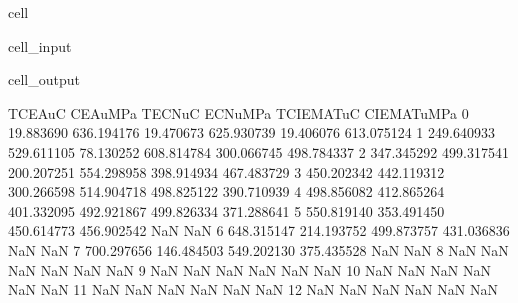 \documentclass[letterpaper,10pt,english]{jupyterBook}
\begin{document}
\begin{sphinxuseclass}{cell}
\begin{sphinxVerbatimInput}
\begin{sphinxuseclass}{cell_input}
\begin{sphinxVerbatim}[commandchars=\\\{\}]
					  \PYG{p}{[}\PYG{p}{[}\PYG{p}{]}    \PYG{p}{]}  
					
					 
					 \PYG{p}{[}\PYG{p}{]} \PYG{o}{*} \PYG{n}{i}    \PYG{p}{(}\PYG{p}{)}
				\end{sphinxVerbatim}
				
		\end{sphinxuseclass}\end{sphinxVerbatimInput}
		\begin{sphinxVerbatimOutput}
			
			\begin{sphinxuseclass}{cell_output}
				\begin{sphinxVerbatim}[commandchars=\\\{\}]
					T\PYGZus{}CEA\PYGZus{}uC    CEA\PYGZus{}uMPa    T\PYGZus{}ECN\PYGZus{}uC    ECN\PYGZus{}uMPa  T\PYGZus{}CIEMAT\PYGZus{}uC  CIEMAT\PYGZus{}uMPa  \PYGZbs{}
					0    19.883690  636.194176   19.470673  625.930739    19.406076   613.075124   
					1   249.640933  529.611105   78.130252  608.814784   300.066745   498.784337   
					2   347.345292  499.317541  200.207251  554.298958   398.914934   467.483729   
					3   450.202342  442.119312  300.266598  514.904718   498.825122   390.710939   
					4   498.856082  412.865264  401.332095  492.921867   499.826334   371.288641   
					5   550.819140  353.491450  450.614773  456.902542          NaN          NaN   
					6   648.315147  214.193752  499.873757  431.036836          NaN          NaN   
					7   700.297656  146.484503  549.202130  375.435528          NaN          NaN   
					8          NaN         NaN         NaN         NaN          NaN          NaN   
					9          NaN         NaN         NaN         NaN          NaN          NaN   
					10         NaN         NaN         NaN         NaN          NaN          NaN   
					11         NaN         NaN         NaN         NaN          NaN          NaN   
					12         NaN         NaN         NaN         NaN          NaN          NaN   
					

\end{sphinxVerbatim}
\end{sphinxuseclass}
\end{sphinxVerbatimOutput}
\end{sphinxuseclass}
\end{document}
